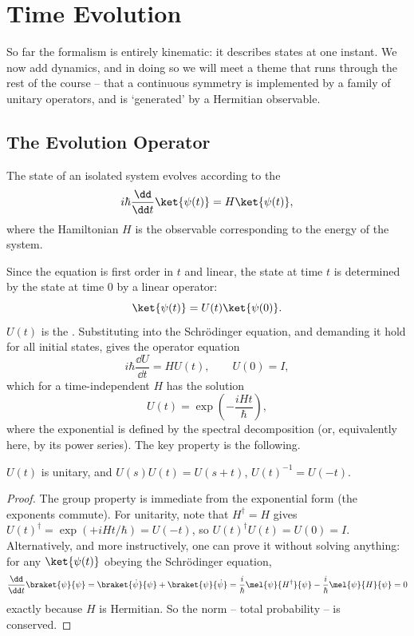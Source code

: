 \section{Time Evolution}

So far the formalism is entirely kinematic: it describes states at one instant. We now add dynamics, and in doing so we will meet a theme that runs through the rest of the course -- that a continuous symmetry is implemented by a family of unitary operators, and is `generated' by a Hermitian observable.

\subsection{The Evolution Operator}

\begin{axiom}
    The state of an isolated system evolves according to the 
    $$
    i \hbar \frac{\dd}{\dd t} \ket{\psi(t)} = H \ket{\psi(t)},
    $$
    where the Hamiltonian $H$ is the observable corresponding to the energy of the system.
\end{axiom}

Since the equation is first order in $t$ and linear, the state at time $t$ is determined by the state at time $0$ by a linear operator:
$$
\ket{\psi(t)} = U(t) \ket{\psi(0)}.
$$
$U(t)$ is the . Substituting into the Schr\"odinger equation, and demanding it hold for all initial states, gives the operator equation
$$
i\hbar \frac{\dd U}{\dd t} = H U(t), \qquad U(0) = I,
$$
which for a time-independent $H$ has the solution
$$
U(t) = \exp\left(-\frac{i H t}{\hbar}\right),
$$
where the exponential is defined by the spectral decomposition (or, equivalently here, by its power series). The key property is the following.

\begin{proposition}
    $U(t)$ is unitary, and $U(s)U(t) = U(s+t)$, $U(t)^{-1} = U(-t)$.
\end{proposition}
\begin{proof}
    The group property is immediate from the exponential form (the exponents commute). For unitarity, note that $H^\dagger = H$ gives $U(t)^\dagger = \exp(+iHt/\hbar) = U(-t)$, so $U(t)^\dagger U(t) = U(0) = I$. Alternatively, and more instructively, one can prove it without solving anything: for any $\ket{\psi(t)}$ obeying the Schr\"odinger equation,
    $$
    \frac{\dd}{\dd t}\braket{\psi}{\psi} = \braket{\dot\psi}{\psi} + \braket{\psi}{\dot\psi} = \frac{i}{\hbar}\mel{\psi}{H^\dagger}{\psi} - \frac{i}{\hbar}\mel{\psi}{H}{\psi} = 0
    $$
    exactly because $H$ is Hermitian. So the norm -- total probability -- is conserved.
\end{proof}

